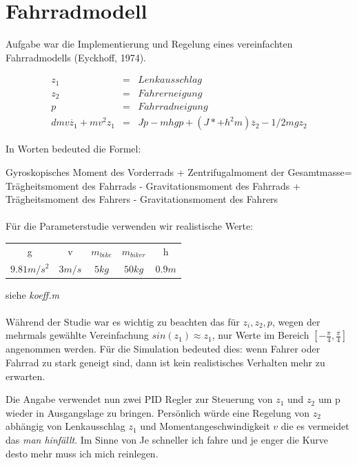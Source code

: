 \documentclass[a4paper]{article}
\begin{document}
\section{Fahrradmodell}

Aufgabe war die Implementierung und Regelung eines vereinfachten Fahrradmodells (Eyckhoff, 1974).

\begin{eqnarray}
z_1 & =& Lenkausschlag \\
z_2 & =& Fahrerneigung \\
p & =& Fahrradneigung \\
dmv\dot{z_1} + mv^2z_1 & = & J\ddot{p} - mhgp + (J* + h^2m)\ddot{z_2} - 1/2mgz_2 
\end{eqnarray}

In Worten bedeuted die Formel:

Gyroskopisches Moment des Vorderrads + Zentrifugalmoment der Gesamtmasse= Trägheitsmoment des Fahrrads - Gravitationsmoment des Fahrrads + Trägheitsmoment des Fahrers - Gravitationsmoment des Fahrers

\paragraph*{}
Für die Parameterstudie verwenden wir realistische Werte:

\begin{tabular}{ccccc}
 g          & v         & $m_{bike}$  & $m_{biker}$    & h     \\ 
 $9.81 m/s^2$ & $3 m/s$ & $5 kg$      & $50 kg$        & $0.9 m$   
\end{tabular} 
siehe \textit{koeff.m} 


\paragraph*{}
W\"ahrend der Studie war es wichtig zu beachten das für $z_i,z_2,p$, wegen der mehrmals gew\"ahlte Vereinfachung $sin(z_1)\approx z_1$, nur Werte im Bereich $ [ -\frac{\pi}{4},  \frac{\pi}{4}]$  angenommen werden.
F\"ur die Simulation bedeuted dies: wenn Fahrer oder Fahrrad zu stark geneigt sind, dann ist kein realistisches Verhalten mehr zu erwarten.

Die Angabe verwendet nun zwei PID Regler zur Steuerung von $z_1$ und $z_2$ um p wieder in Ausgangslage zu bringen. 
Pers\"onlich w\"urde eine Regelung von $z_2$ abh\"angig von Lenkausschlag $z_1$ und Momentangeschwindigkeit $v$ die es vermeidet das \textit{man hinfällt}.
Im Sinne von Je schneller ich fahre und je enger die Kurve desto mehr muss ich mich reinlegen.
\end{document}

